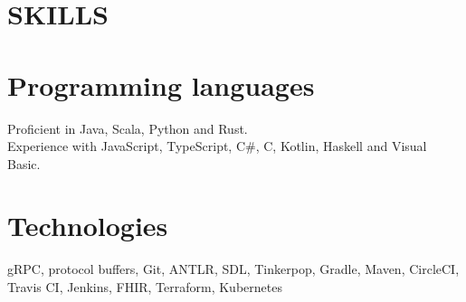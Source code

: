 \documentclass[margin]{res}
\begin{document}
\begin{resume}
\section{SKILLS}

\normalsize{\section{Programming languages}}
Proficient in Java, Scala, Python and Rust. \\
Experience with JavaScript, TypeScript, C\#, C, Kotlin, Haskell and Visual Basic.

\normalsize{\section{Technologies}}
gRPC, protocol buffers, Git, ANTLR, SDL, Tinkerpop, Gradle, Maven, CircleCI, Travis CI, Jenkins, FHIR, Terraform, Kubernetes

\end{resume}
\end{document}
